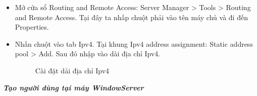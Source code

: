   \begin{itemize}
      \item Mở cửa sổ Routing and Remote Access: Server Manager > Tools > Routing and Remote Access. Tại đây ta nhấp chuột phải vào tên máy chủ và đi đến Properties.
    \item Nhấn chuột vào tab Ipv4. Tại khung Ipv4 address assignment: Static address pool > Add. Sau đó nhập vào dài địa chỉ Ipv4.
   \newpage   
      \begin{figure}[htbp]
            \hfill
            \hfill
            \caption{Cài đặt dải địa chỉ Ipv4}
        \end{figure}

 \end{itemize}

 \textbf{\textit{Tạo người dùng tại máy WindowServer}}
 
